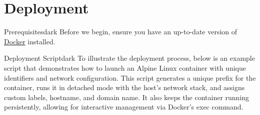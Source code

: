 \section{Deployment}
\label{Prerequisites}
\begin{baseBoxThree}{Prerequisites}{dark}
    Before we begin, ensure you have an up-to-date version of \href{https://docs.docker.com/get-docker/}{Docker} installed.
\end{baseBoxThree}

\label{Deployment Script}
\begin{baseBoxThree}{Deployment Script}{dark}
    \bigskip
    To illustrate the deployment process, below is an example script that demonstrates how to launch an Alpine Linux container with unique identifiers and network configuration.
    This script generates a unique prefix for the container, runs it in detached mode with the host's network stack, and assigns custom labels, hostname, and domain name. It also keeps the container running persistently, allowing for interactive management via Docker's exec command.
    \bigskip


\end{baseBoxThree}
